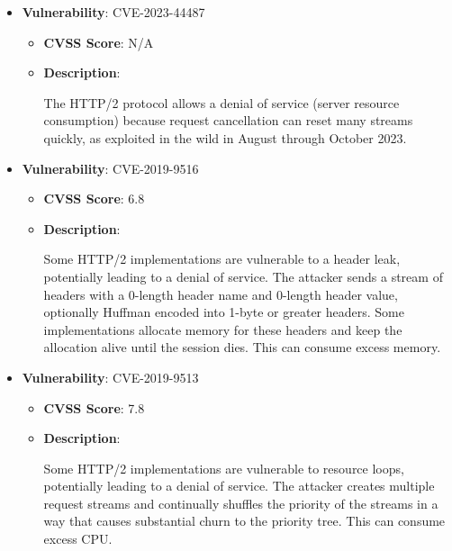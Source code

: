 \documentclass{article}
\begin{document}
\begin{itemize}
    
        \item \textbf{Vulnerability}: CVE-2023-44487
        \begin{itemize}
            \item \textbf{CVSS Score}:  N/A 
            \item \textbf{Description}:
            \parbox[t]{0.9\linewidth}{
                \ttfamily The HTTP/2 protocol allows a denial of service (server resource consumption) because request cancellation can reset many streams quickly, as exploited in the wild in August through October 2023.
            }
        \end{itemize}
    
        \item \textbf{Vulnerability}: CVE-2019-9516
        \begin{itemize}
            \item \textbf{CVSS Score}:  6.8 
            \item \textbf{Description}:
            \parbox[t]{0.9\linewidth}{
                \ttfamily Some HTTP/2 implementations are vulnerable to a header leak, potentially leading to a denial of service. The attacker sends a stream of headers with a 0-length header name and 0-length header value, optionally Huffman encoded into 1-byte or greater headers. Some implementations allocate memory for these headers and keep the allocation alive until the session dies. This can consume excess memory.
            }
        \end{itemize}
    
        \item \textbf{Vulnerability}: CVE-2019-9513
        \begin{itemize}
            \item \textbf{CVSS Score}:  7.8 
            \item \textbf{Description}:
            \parbox[t]{0.9\linewidth}{
                \ttfamily Some HTTP/2 implementations are vulnerable to resource loops, potentially leading to a denial of service. The attacker creates multiple request streams and continually shuffles the priority of the streams in a way that causes substantial churn to the priority tree. This can consume excess CPU.
            }
        \end{itemize}
    

\end{itemize}
\end{document}
